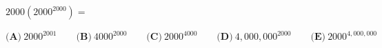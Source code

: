 $2000\left(2000^{2000}\right)=$

$\textbf{(A)}\ 2000^{2001}\qquad\textbf{(B)}\ 4000^{2000}\qquad\textbf{(C)}\ 2000^{4000}\qquad\textbf{(D)}\ 4{,}000{,}000^{2000}\qquad\textbf{(E)}\ 2000^{4{,}000{,}000}$
